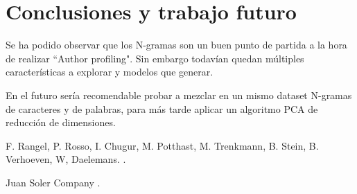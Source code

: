 \documentclass[11pt,a4paper]{article}
\begin{document}
\section{Conclusiones y trabajo futuro}

Se ha podido observar que los N-gramas son un buen punto de partida a la hora de realizar ``Author profiling". Sin embargo todavían quedan múltiples características a explorar y modelos que generar.

En el futuro sería recomendable probar a mezclar en un mismo dataset N-gramas de caracteres y de palabras, para más tarde aplicar un algoritmo PCA de reducción de dimensiones.


\begin{thebibliography}{}

F. Rangel, P. Rosso, I. Chugur, M. Potthast, M. Trenkmann, B. Stein, B. Verhoeven, W, Daelemans.
.

Juan Soler Company
.

\end{thebibliography}
\end{document}
